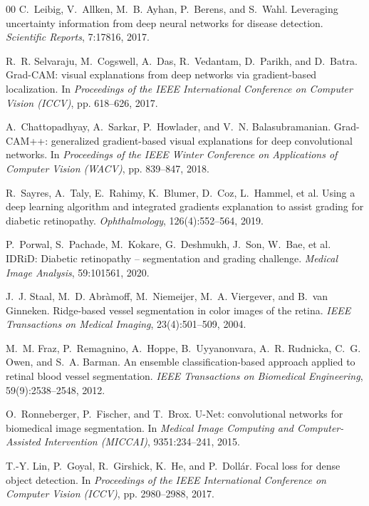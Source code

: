 \documentclass[review,12pt]{elsarticle}
\begin{document}
\begin{thebibliography}{00}
C.~Leibig, V.~Allken, M.~B. Ayhan, P.~Berens, and S.~Wahl.
\newblock Leveraging uncertainty information from deep neural networks for
disease detection.
\newblock \textit{Scientific Reports}, 7:17816, 2017.

R.~R. Selvaraju, M.~Cogswell, A.~Das, R.~Vedantam, D.~Parikh, and
D.~Batra.
\newblock Grad-CAM: visual explanations from deep networks via gradient-based
localization.
\newblock In \textit{Proceedings of the IEEE International Conference on
Computer Vision (ICCV)}, pp. 618--626, 2017.

A.~Chattopadhyay, A.~Sarkar, P.~Howlader, and V.~N. Balasubramanian.
\newblock Grad-CAM++: generalized gradient-based visual explanations for deep
convolutional networks.
\newblock In \textit{Proceedings of the IEEE Winter Conference on Applications
of Computer Vision (WACV)}, pp. 839--847, 2018.

R.~Sayres, A.~Taly, E.~Rahimy, K.~Blumer, D.~Coz, L.~Hammel, et al.
\newblock Using a deep learning algorithm and integrated gradients explanation
to assist grading for diabetic retinopathy.
\newblock \textit{Ophthalmology}, 126(4):552--564, 2019.

P.~Porwal, S.~Pachade, M.~Kokare, G.~Deshmukh, J.~Son, W.~Bae, et al.
\newblock IDRiD: Diabetic retinopathy -- segmentation and grading challenge.
\newblock \textit{Medical Image Analysis}, 59:101561, 2020.

J.~J. Staal, M.~D. Abr{\`a}moff, M.~Niemeijer, M.~A. Viergever, and
B.~van Ginneken.
\newblock Ridge-based vessel segmentation in color images of the retina.
\newblock \textit{IEEE Transactions on Medical Imaging}, 23(4):501--509, 2004.

M.~M. Fraz, P.~Remagnino, A.~Hoppe, B.~Uyyanonvara, A.~R. Rudnicka,
C.~G. Owen, and S.~A. Barman.
\newblock An ensemble classification-based approach applied to retinal blood
vessel segmentation.
\newblock \textit{IEEE Transactions on Biomedical Engineering},
59(9):2538--2548, 2012.

O.~Ronneberger, P.~Fischer, and T.~Brox.
\newblock U-Net: convolutional networks for biomedical image segmentation.
\newblock In \textit{Medical Image Computing and Computer-Assisted Intervention
(MICCAI)}, 9351:234--241, 2015.

T.-Y. Lin, P.~Goyal, R.~Girshick, K.~He, and P.~Doll{\'a}r.
\newblock Focal loss for dense object detection.
\newblock In \textit{Proceedings of the IEEE International Conference on
Computer Vision (ICCV)}, pp. 2980--2988, 2017.


\end{thebibliography}
\end{document}
